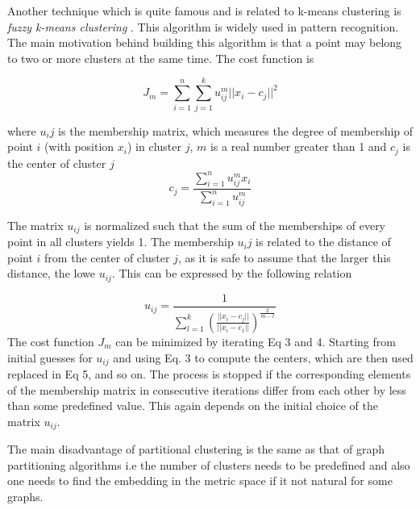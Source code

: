 \documentclass[letterpaper]{article}
\begin{document}
Another technique which is quite famous and is related to k-means clustering is
\emph{fuzzy k-means clustering} \cite{bez84}. This algorithm is widely used in pattern  recognition. 
The main motivation behind building this algorithm is that a point may belong to two or more clusters
at the same time. The cost function is 

\begin{equation}
J_m = \sum_{i=1}^n \sum_{j=1}^k u_{ij}^m ||x_i-c_j||^2
\end{equation}

where $u_ij$ is the membership matrix, which measures the degree of membership
of point $i$ (with position $x_i$) in cluster $j$, $m$ is a real number greater
than 1 and $c_j$ is the center of cluster $j$
 \begin{equation} c_j =
\frac{\sum_{i=1}^n u_{ij}^m x_i}{\sum_{i=1}^n u_{ij}^m} 
\end{equation}

The matrix $u_{ij}$ is normalized such that the sum of the memberships of every
point in all clusters yields 1. The membership $u_ij$ is related to the distance of point $i$ from the
center of cluster $j$, as it is safe to assume that the larger this distance, the lowe $u_{ij}$. This
can be expressed by the following relation

\begin{equation}
u_{ij}=\frac{1}{\sum_{l=1}^k(\frac{||x_i-c_j||}{||x_i-c_1||})^\frac{2}{m-l}}
\end{equation}
The cost function $J_m$ can be minimized by iterating Eq 3 and 4. Starting from
initial guesses for $u_{ij}$ and using Eq. 3 to compute the centers, which are
then used replaced in Eq 5, and so on. The process is stopped if the
corresponding elements of the membership matrix in consecutive iterations
differ from each other by less than some predefined value. This again depends
on the initial choice of the matrix $u_{ij}$.

The main disadvantage of partitional clustering is the same as that of graph
partitioning algorithms i.e the number of clusters needs to be predefined and
also one needs to find the embedding in the metric space if it not natural for
some graphs.
\end{document}
